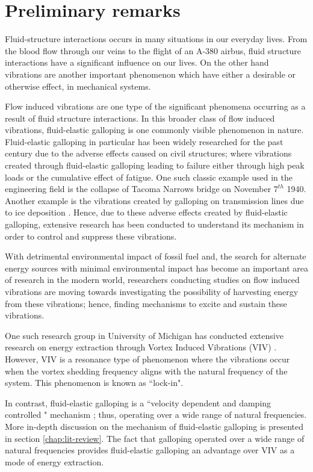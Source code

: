 \chapter{Preliminary remarks}

Fluid-structure interactions occurs in many situations in our everyday lives. From the blood flow through our veins to the flight of an A-380 airbus, fluid structure interactions have a significant influence on our lives. On the other hand vibrations are another important phenomenon which have either a desirable or otherwise effect, in mechanical systems.  


Flow induced vibrations are one type of the significant phenomena occurring as a result of fluid structure interactions. In this broader class of flow induced vibrations, fluid-elastic galloping is one commonly visible phenomenon in nature. Fluid-elastic galloping in particular has been widely researched for the past century due to the adverse effects caused on civil structures; where vibrations created through fluid-elastic galloping  leading to failure either through high peak loads or the cumulative effect of fatigue. One such classic example used in the engineering field is the collapse of Tacoma Narrows bridge on November $7^{th}$ 1940. Another example is the vibrations created by galloping on transmission lines due to ice deposition \citep{Parkinson1964}. Hence, due to these adverse effects created by fluid-elastic galloping, extensive research has been conducted to understand its mechanism in order to control and suppress these vibrations.  

With detrimental environmental impact of  fossil fuel and, the search for alternate energy sources with minimal environmental impact has become an important area of research in the modern world, researchers conducting studies on flow induced vibrations are moving towards investigating the possibility of harvesting energy from these vibrations; hence, finding mechanisms to excite and sustain these vibrations\citep{Barrero-Gil2010a}.  

One such research group in University of Michigan has conducted extensive research on energy extraction through Vortex Induced Vibrations (VIV) \citep{Bernitsas2008a-concept, Bernitsas2009, Raghavan2010a, Lee2011b}. However, VIV is a resonance type of phenomenon where the vibrations occur when the vortex shedding frequency aligns with the natural frequency of the system. This phenomenon is known as ``lock-in".

In contrast, fluid-elastic galloping is a ``velocity dependent and damping controlled " mechanism \citep{Paidoussis2010}; thus, operating over a wide range of natural frequencies.  More in-depth discussion on the mechanism of fluid-elastic galloping is presented in section \ref{chap:lit-review}. The fact that galloping operated over a wide range of natural frequencies provides fluid-elastic galloping an advantage over VIV as a mode of energy extraction.


